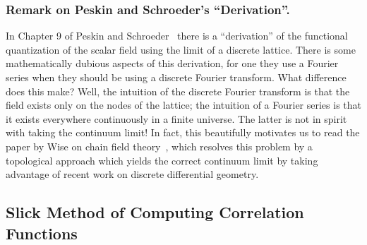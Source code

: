 \subsubsection{Remark on Peskin and Schroeder's ``Derivation''.}
In Chapter 9 of Peskin and Schroeder~\cite{Peskin:1995ev} there
is a ``derivation'' of the functional quantization of the scalar
field using the limit of a discrete lattice. There is some
mathematically dubious aspects of this derivation, for one they
use a Fourier series when they should be using a discrete Fourier
transform. What difference does this make? Well, the intuition of
the discrete Fourier transform is that the field exists only on
the nodes of the lattice; the intuition of a Fourier series is
that it exists everywhere continuously in a finite universe. The
latter is not in spirit with taking the continuum limit! In fact,
this beautifully motivates us to read the paper by Wise on chain field
theory~\cite{Wise:2005mp}, which resolves this problem by a
topological approach which yields the correct continuum limit by
taking advantage of recent work on discrete differential geometry.

\subsection{Slick Method of Computing Correlation Functions}


